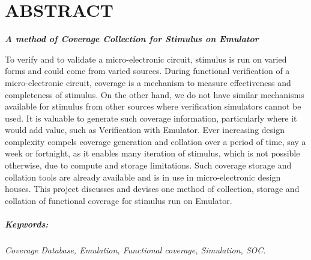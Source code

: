 \documentclass[a4paper,12pt]{report}
\begin{document}
\chapter*{\centering \Large{ABSTRACT}}


\centerline{\emph{\large{\bf A method of Coverage Collection for Stimulus on Emulator }}}
\vspace{10pt}
To verify and to validate a micro-electronic circuit, stimulus is run on varied forms and could come from varied sources. During functional verification of a micro-electronic circuit, coverage is a mechanism to measure effectiveness and completeness of stimulus. On the other hand, we do not have similar mechanisms available for stimulus from other sources where verification simulators cannot be used. It is valuable to generate such coverage information, particularly where it would add value, such as Verification with Emulator. Ever increasing design complexity compels coverage generation and collation over a period of time, say a week or fortnight, as it enables many iteration of stimulus, which is not possible otherwise, due to compute and storage limitations. Such coverage storage and collation tools are already available and is in use in micro-electronic design houses. This project discusses and devises one method of collection, storage and collation of functional coverage for stimulus run on Emulator.



\paragraph{Keywords:}
 \emph{Coverage Database, Emulation, Functional coverage, Simulation, SOC.}
\end{document}
